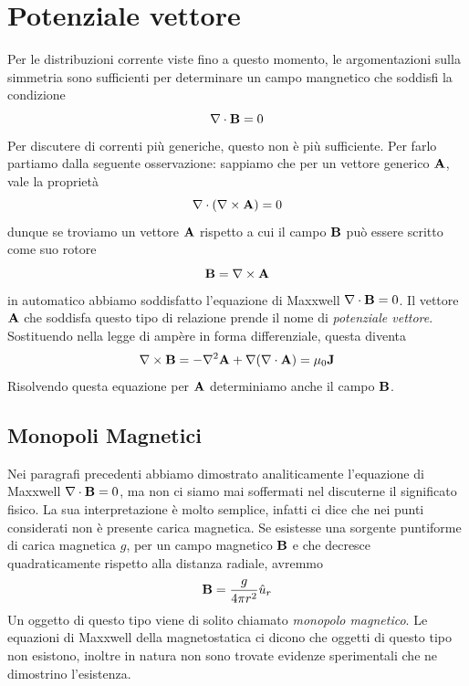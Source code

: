 \section{Potenziale vettore}

Per le distribuzioni corrente viste fino a questo momento, le argomentazioni sulla simmetria sono sufficienti per determinare un campo mangnetico che soddisfi la condizione 
\begin{equation*}
	\nabla \cdot \bold{B} = 0
\end{equation*}
Per discutere di correnti pi\`u generiche, questo non \`e pi\`u sufficiente. Per farlo partiamo dalla seguente osservazione: sappiamo che per un vettore generico $\bold{A}$, vale la propriet\`a 
\begin{equation*}
	\nabla \cdot (\nabla \times \bold{A}) =0
\end{equation*}
dunque se troviamo un vettore $\bold{A}$ rispetto a cui il campo $\bold{B}$ pu\`o essere scritto come suo rotore
\begin{equation*}
	\bold{B} = \nabla \times \bold{A}
\end{equation*}
in automatico abbiamo soddisfatto l'equazione di Maxxwell $\nabla \cdot \bold{B} = 0$. Il vettore $\bold{A}$ che soddisfa questo tipo di relazione prende il nome di \textit{potenziale vettore}. Sostituendo nella legge di amp\`ere in forma differenziale, questa diventa
\begin{equation}
	\nabla \times \bold{B} = - \nabla^2\bold{A} + \nabla(\nabla \cdot \bold{A}) = \mu_0 \bold{J}
\end{equation}
Risolvendo questa equazione per $\bold{A}$ determiniamo anche il campo $\bold{B}$.

\subsection{Monopoli Magnetici}

Nei paragrafi precedenti abbiamo dimostrato analiticamente l'equazione di Maxxwell $\nabla \cdot \bold{B} = 0 $, ma non ci siamo mai soffermati nel discuterne il significato fisico. La sua interpretazione \`e molto semplice, infatti ci dice che nei punti considerati non \`e presente carica magnetica. Se esistesse una sorgente puntiforme di carica magnetica $g$, per un campo magnetico $\bold{B}$ e che decresce quadraticamente rispetto alla distanza radiale, avremmo 
\begin{equation*}
	\bold{B} = \frac{g}{4\pi r^2}\hat{u}_{r}
\end{equation*} 
Un oggetto di questo tipo viene di solito chiamato \textit{monopolo magnetico}. Le equazioni di Maxxwell della magnetostatica ci dicono che oggetti di questo tipo non esistono, inoltre in natura non sono trovate evidenze sperimentali che ne dimostrino l'esistenza.
\newline


